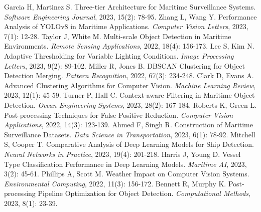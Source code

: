 \documentclass[twoside]{article}
\begin{document}
\begin{multicols}{2}
\begin{thebibliography}{99}
 Garcia H, Martinez S. Three-tier Architecture for Maritime Surveillance Systems. {\it Software Engineering Journal}, 2023, 15(2): 78-95.
 Zhang L, Wang Y. Performance Analysis of YOLOv8 in Maritime Applications. {\it Computer Vision Letters}, 2023, 7(1): 12-28.
 Taylor J, White M. Multi-scale Object Detection in Maritime Environments. {\it Remote Sensing Applications}, 2022, 18(4): 156-173.
 Lee S, Kim N. Adaptive Thresholding for Variable Lighting Conditions. {\it Image Processing Letters}, 2023, 9(2): 89-102.
 Miller R, Jones B. DBSCAN Clustering for Object Detection Merging. {\it Pattern Recognition}, 2022, 67(3): 234-248.
 Clark D, Evans A. Advanced Clustering Algorithms for Computer Vision. {\it Machine Learning Review}, 2023, 12(1): 45-59.
 Turner P, Hall C. Context-aware Filtering in Maritime Object Detection. {\it Ocean Engineering Systems}, 2023, 28(2): 167-184.
 Roberts K, Green L. Post-processing Techniques for False Positive Reduction. {\it Computer Vision Applications}, 2022, 14(3): 123-139.
 Ahmed F, Singh R. Construction of Maritime Surveillance Datasets. {\it Data Science in Transportation}, 2023, 6(1): 78-92.
 Mitchell S, Cooper T. Comparative Analysis of Deep Learning Models for Ship Detection. {\it Neural Networks in Practice}, 2023, 19(4): 201-218.
 Harris J, Young D. Vessel Type Classification Performance in Deep Learning Models. {\it Maritime AI}, 2023, 3(2): 45-61.
 Phillips A, Scott M. Weather Impact on Computer Vision Systems. {\it Environmental Computing}, 2022, 11(3): 156-172.
 Bennett R, Murphy K. Post-processing Pipeline Optimization for Object Detection. {\it Computational Methods}, 2023, 8(1): 23-39.
\end{thebibliography}

\end{multicols}
\end{document}
